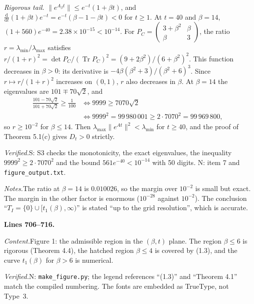 \documentclass[11pt]{amsart}
\newcommand{\Tr}{\operatorname{Tr}}
\newcommand{\src}[1]{\par\bigskip\noindent\textbf{Lines #1.}\enspace}
\newcommand{\content}{\par\smallskip\noindent\textit{Content.}\enspace}
\newcommand{\verified}{\par\smallskip\noindent\textit{Verified.}\enspace}
\newcommand{\notes}{\par\smallskip\noindent\textit{Notes.}\enspace}
\newcommand{\tS}{\textsf{S}}
\newcommand{\tN}{\textsf{N}}
\newcommand{\file}[1]{\texttt{#1}}
\begin{document}
\emph{Rigorous tail.} $\|e^{A_\beta t}\|\le e^{-t}(1+\beta t)$, and
$\frac{\mathrm d}{\mathrm dt}(1+\beta t)e^{-t}=e^{-t}(\beta-1-\beta t)<0$ for $t\ge1$. At $t=40$ and $\beta=14$,
$(1+560)e^{-40}=2.38\times10^{-15}<10^{-14}$. For $P_C=\begin{pmatrix}3+\beta^2&\beta\\\beta&3\end{pmatrix}$, the
ratio $r=\lambda_{\min}/\lambda_{\max}$ satisfies $r/(1+r)^2=\det P_C/(\Tr P_C)^2=(9+2\beta^2)/(6+\beta^2)^2$. This
function decreases in $\beta>0$: its derivative is $-4\beta(\beta^2+3)/(\beta^2+6)^3$. Since $r\mapsto r/(1+r)^2$
increases on $(0,1)$, $r$ also decreases in $\beta$. At $\beta=14$ the eigenvalues are $101\mp70\sqrt2$, and
\begin{align*}
\frac{101-70\sqrt2}{101+70\sqrt2}\ge\frac1{100}
&\iff9999\ge7070\sqrt2\\
&\iff9999^2=99\,980\,001\ge2\cdot7070^2=99\,969\,800,
\end{align*}
so $r\ge10^{-2}$ for $\beta\le14$. Then $\lambda_{\max}\|e^{At}\|^2<\lambda_{\min}$ for $t\ge40$, and the proof of
Theorem 5.1(c) gives $D_t>0$ strictly.
\verified \tS: S3 checks the monotonicity, the exact eigenvalues, the inequality $9999^2\ge2\cdot7070^2$ and the bound
$561e^{-40}<10^{-14}$ with 50 digits. \tN: item 7 and \file{figure\_output.txt}.
\notes The ratio at $\beta=14$ is $0.010026$, so the margin over $10^{-2}$ is small but exact. The margin in the other
factor is enormous ($10^{-28}$ against $10^{-2}$). The conclusion ``$T_I=\{0\}\cup[t_1(\beta),\infty)$'' is stated
``up to the grid resolution'', which is accurate.

\src{706--716}
\content Figure 1: the admissible region in the $(\beta,t)$ plane. The region $\beta\le6$ is rigorous (Theorem 4.4),
the hatched region $\beta\le4$ is covered by (1.3), and the curve $t_1(\beta)$ for $\beta>6$ is numerical.
\verified \tN: \file{make\_figure.py}; the legend references ``(1.3)'' and ``Theorem 4.1'' match the compiled numbering.
The fonts are embedded as TrueType, not Type~3.
\end{document}

